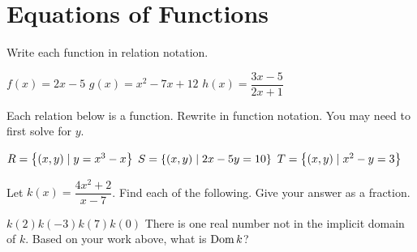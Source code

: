 \section*{Equations of Functions}
Write each function in relation notation.
\begin{smenum}
\mitemxxx
{$f(x)=2x-5$}
{$g(x)=x^2-7x+12$}
{$h(x)=\dfrac{3x-5}{2x+1}$}
\end{smenum}
Each relation below is a function. Rewrite in function notation. You may need to first solve for $y$.
\begin{smenum}
\mitemxxx
{$R=\left\{(x,y)\mid y=x^3-x\right\}$}
{$S=\left\{(x,y)\mid2x-5y=10\right\}$}
{$T=\left\{(x,y)\mid x^2-y=3\right\}$}
\end{smenum}
Let $k(x)=\dfrac{4x^2+2}{x-7}$. Find each of the following. Give your answer as a fraction.
\begin{smenum}
\mitemxxxx
{$k(2)$}{$k(-3)$}{$k(7)$}{$k(0)$}
\mitemx
{There is one real number not in the implicit domain of $k$. Based on your work above, what is $\operatorname{Dom} k$?}
\end{smenum}
